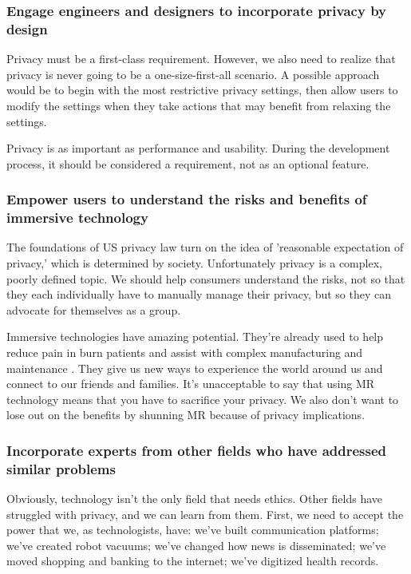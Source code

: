 \subsubsection{Engage engineers and designers to incorporate privacy by design}

Privacy must be a first-class requirement. However, we also need to realize that privacy is never going to be a one-size-first-all scenario. A possible approach would be to begin with the most restrictive privacy settings, then allow users to modify the settings when they take actions that may benefit from relaxing the settings.

Privacy is as important as performance and usability. During the development process, it should be considered a requirement, not as an optional feature.

\subsubsection{Empower users to understand the risks and benefits of immersive technology}

The foundations of US privacy law turn on the idea of 'reasonable expectation of privacy,' which is determined by society. Unfortunately privacy is a complex, poorly defined topic. We should help consumers understand the risks, not so that they each individually have to manually manage their privacy, but so they can advocate for themselves as a group.

Immersive technologies have amazing potential. They're already used to help reduce pain in burn patients \cite{hoffman2001effectiveness} and assist with complex manufacturing and maintenance \cite{palmarini2018systematic}. They give us new ways to experience the world around us and connect to our friends and families. It's unacceptable to say that using MR technology means that you have to sacrifice your privacy. We also don't want to lose out on the benefits by shunning MR because of privacy implications.

\subsubsection{Incorporate experts from other fields who have addressed similar problems}

Obviously, technology isn't the only field that needs ethics. Other fields have struggled with privacy, and we can learn from them. First, we need to accept the power that we, as technologists, have: we've built communication platforms; we've created robot vacuums; we've changed how news is disseminated; we've moved shopping and banking to the internet; we've digitized health records.

